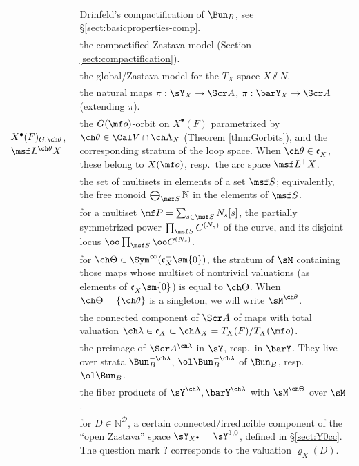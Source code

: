 \documentclass[final]{amsart}
\theoremstyle{remark}
\theoremstyle{definition}
\numberwithin{equation}{section}
\begin{document}
\begin{longtable}{>{\raggedleft}p{} p{} }
{$\ol\Bun_B$} & {Drinfeld's compactification of $\Bun_B$, see \S\ref{sect:basicproperties-comp}.}
\\
{$\barY_X$}& {the compactified Zastava model (Section \ref{sect:compactification}).}
\\
{$\Scr A$} & {the global/Zastava model for the $T_X$-space $X\sslash N$.}
\\
{$\pi,\bar\pi$} & the natural maps $\pi:\sY_X\to\Scr A$, $\bar\pi:\barY_X\to\Scr A$ (extending $\pi$). 
\\
$X^\bullet(F)_{G:\ch\theta}$, $\msf L^{\ch\theta}X$ & 
{the $G(\mf o)$-orbit on $X^\bullet(F)$ parametrized by $\ch\theta\in \Cal V \cap \ch\Lambda_X$ (Theorem \ref{thm:Gorbits}), and the corresponding stratum of the loop space. When $\ch\theta \in \mathfrak c_X^-$, these belong to $X(\mf o)$, resp.\ the arc space $\msf L^+X$.}
\\
{$\Sym^\infty(\msf S)$} & 
{the set of multisets in elements of a set $\msf S$; equivalently, the free monoid $\bigoplus_{\msf S}\mathbb N$ in the elements of $\msf S$.}
\\
{$C^{\mf P}, \oo C^{\mf P}$} & 
{for a multiset $\mf P = \sum_{s\in \msf S} N_s [s]$, the partially symmetrized power $\prod_{\msf S} C^{(N_s)}$ of the curve, and its disjoint locus $\oo\prod_{\msf S} \oo C^{(N_s)}$.}
\\
{$\sM^{\ch\Theta}$} & 
{for $\ch\Theta \in \Sym^\infty(\mathfrak c_X^-\sm \{0\})$, the stratum of $\sM$ containing those maps whose multiset of nontrivial valuations (as elements of $\mathfrak c_X^-\sm \{0\}$) is equal to $\ch\Theta$. When $\ch\Theta=\{\ch\theta\}$ is a singleton, we will write $\sM^{\ch\theta}$.}
\\
{$\Scr A^{\ch\lambda}$} & {the connected component of $\Scr A$ of maps with total valuation $\ch\lambda \in \mathfrak c_X \subset \ch\Lambda_X= T_X(F)/T_X(\mf o)$.} 
\\
{$\sY^{\ch\lambda}, \barY^{\ch\lambda}$} & {the preimage of $\Scr A^{\ch\lambda}$ in $\sY$, resp.\ in $\barY$. They live over strata $\Bun_B^{-\ch\lambda}$, $\ol\Bun_B^{-\ch\lambda}$ of $\Bun_B$, resp.\ $\ol\Bun_B$.}
\\
{$\sY^{\ch\lambda,\ch\Theta},\, \barY^{\ch\lambda,\ch\Theta}$} & {the fiber products of $\sY^{\ch\lambda}, \barY^{\ch\lambda}$ with $\sM^{\ch\Theta}$ over $\sM$.}
\\
{$\sY^D$} & {for $D \in \mathbb N^{\mathcal D}$, a certain connected/irreducible component of the ``open Zastava'' space $\sY_{X^\bullet} = \sY^{?,0}$, defined in \S \ref{sect:Y0cc}. The question mark $?$ corresponds to the valuation $\varrho_X(D)$.}

\end{longtable}
\end{document}
